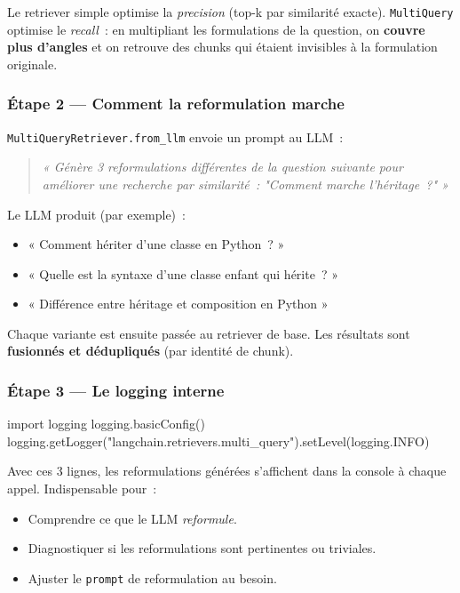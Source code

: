 \documentclass[11pt,a4paper]{article}
\begin{document}
Le retriever simple optimise la \emph{precision} (top-k par similarité
exacte). \texttt{MultiQuery} optimise le \emph{recall}~: en multipliant
les formulations de la question, on \textbf{couvre plus d'angles} et on
retrouve des chunks qui étaient invisibles à la formulation originale.

\subsubsection*{Étape 2 — Comment la reformulation marche}

\texttt{MultiQueryRetriever.from\_llm} envoie un prompt au LLM~:

\begin{quote}\itshape
« Génère 3 reformulations différentes de la question suivante pour
améliorer une recherche par similarité~: "Comment marche l'héritage~?" »
\end{quote}

Le LLM produit (par exemple)~:
\begin{itemize}[leftmargin=*]
  \item « Comment hériter d'une classe en Python~? »
  \item « Quelle est la syntaxe d'une classe enfant qui hérite~? »
  \item « Différence entre héritage et composition en Python »
\end{itemize}

Chaque variante est ensuite passée au retriever de base. Les résultats
sont \textbf{fusionnés et dédupliqués} (par identité de chunk).

\subsubsection*{Étape 3 — Le logging interne}

\begin{pythoncode}
import logging
logging.basicConfig()
logging.getLogger("langchain.retrievers.multi_query").setLevel(logging.INFO)
\end{pythoncode}

Avec ces 3 lignes, les reformulations générées s'affichent dans la
console à chaque appel. Indispensable pour~:
\begin{itemize}[leftmargin=*]
  \item Comprendre ce que le LLM \emph{reformule}.
  \item Diagnostiquer si les reformulations sont pertinentes ou
        triviales.
  \item Ajuster le \texttt{prompt} de reformulation au besoin.
\end{itemize}
\end{document}
